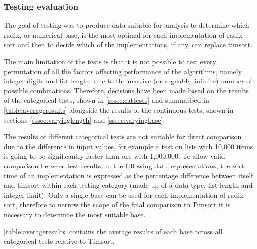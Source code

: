 \documentclass[12pt]{article}
\begin{document}
	\subsubsection{Testing evaluation}
	The goal of testing was to produce data suitable for analysis to determine which radix, or numerical base, is the most optimal for each implementation of radix sort and then to decide which of the implementations, if any, can replace timsort.	
	\par
	The main limitation of the tests is that it is not possible to test every permutation of all the factors affecting performance of the algorithms, namely integer digits and list length, due to the massive (or arguably, infinite) number of possible combinations. Therefore, decisions have been made based on the results of the categorical tests, shown in \ref{sssec:cattests} and summarised in \autoref{table:averageresults} alongside the results of the continuous tests, shown in sections \ref{sssec:varyinglength} and \ref{sssec:varyingbase}.
	\par 
	The results of different categorical tests are not suitable for direct comparison due to the difference in input values, for example a test on lists with 10,000 items is going to be significantly faster than one with 1,000,000. To allow valid comparison between test results, in the following data representations, the sort time of an implementation is expressed as the percentage difference between itself and timsort within each testing category (made up of a data type, list length and integer limit).
	Only a single base can be used for each implementation of radix sort, therefore to narrow the scope of the final comparison to Timsort it is necessary to determine the most suitable base. 
	\par
	\autoref{table:averageresults} contains the average results of each base across all categorical tests relative to Timsort.
\end{document}
